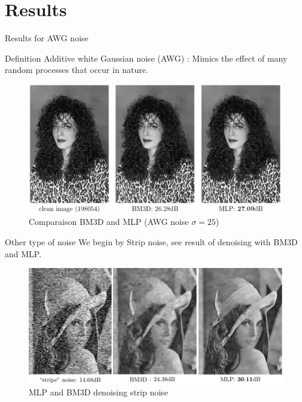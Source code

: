 \documentclass[8pt]{beamer}
\begin{document}
\section{Results}

\begin{frame}{Results for AWG noise}
\begin{block}{Definition}
Additive white Gaussian noise (AWG) : Mimics the effect of many random processes that occur in nature. 
\end{block} 

\begin{figure}[H]
    \begin{center}
        \includegraphics[scale=0.40]{../datasets/images/barbara.png}
        \caption{Comparaison BM3D and MLP (AWG noise $\sigma = 25 $)}
    \end{center}
\end{figure}
    



\end{frame}


\begin{frame}{Other type of noise}
We begin by Strip noise, see result of denoising with BM3D and MLP.

\begin{figure}[H]
    \begin{center}
        \includegraphics[scale=0.45]{../datasets/images/stripnoise.png}
        \caption{MLP and BM3D denoising strip noise}
    \end{center}
\end{figure}
\end{frame}
\end{document}
